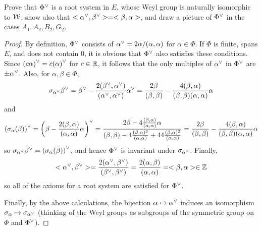 \begin{ex}\label{9.2}
  Prove that ${\Phi}^{\vee}$ is a root system in $E$, whose Weyl group is naturally isomorphic to ${\cal W}$; show also that $< {\alpha}^{\vee}, {\beta}^{\vee}>=<\beta,\alpha>$, and draw a picture of ${\Phi}^{\vee}$ in the cases $A_1,A_2,B_2,G_2$.
\end{ex}
\begin{proof}
  By definition, ${\Phi}^{\vee}$ consists of ${\alpha}^{\vee} = 2\alpha/(\alpha,\alpha)$ for $\alpha\in\Phi$. If $\Phi$ is finite, spans $E$, and does not contain $0$, it is obvious that ${\Phi}^{\vee}$ also satisfies these conditions. Since ${(c\alpha)}^{\vee}=c{(\alpha)}^{\vee}$ for $c\in {\mathbb R}$, it follows that the only multiples of ${\alpha}^{\vee}$ in ${\Phi}^{\vee}$ are $\pm{\alpha}^{\vee}$. Also, for $\alpha,\beta\in\Phi$,
  \begin{equation*}
    \sigma_{{\alpha}^{\vee}}{\beta}^{\vee} = {\beta}^{\vee} - \frac{2({\beta}^{\vee},{\alpha}^{\vee})}{({\alpha}^{\vee},{\alpha}^{\vee})}{\alpha}^{\vee} = \frac{2\beta}{(\beta,\beta)} - \frac{4(\beta,\alpha)}{(\beta,\beta)(\alpha,\alpha)}\alpha
  \end{equation*}
  and
  \begin{equation*}
    {(\sigma_{\alpha}(\beta))}^{\vee} = {\left(\beta-\frac{2(\beta,\alpha)}{(\alpha,\alpha)}\alpha\right)}^{\vee} = \frac{2\beta-4\frac{(\beta,\alpha)}{(\alpha,\alpha)}\alpha}{(\beta,\beta)-4\frac{(\beta,\alpha)^2}{(\alpha,\alpha)}+44\frac{(\beta,\alpha)^2}{(\alpha,\alpha)}} = \frac{2\beta}{(\beta,\beta)} - \frac{4(\beta,\alpha)}{(\beta,\beta)(\alpha,\alpha)}\alpha
  \end{equation*}
  so $\sigma_{{\alpha}^{\vee}}{\beta}^{\vee} = {(\sigma_{\alpha}(\beta))}^{\vee}$, and hence ${\Phi}^{\vee}$ is invariant under $\sigma_{{\alpha}^{\vee}}$. Finally,
  \begin{equation*}
    <{\alpha}^{\vee},{\beta}^{\vee}> = \frac{2({\alpha}^{\vee},{\beta}^{\vee})}{({\beta}^{\vee},{\beta}^{\vee})} = \frac{2(\alpha,\beta)}{(\alpha,\alpha)} = <\beta,\alpha> \in{\mathbb Z}
  \end{equation*}
  so all of the axioms for a root system are satisfied for ${\Phi}^{\vee}$.

  Finally, by the above calculations, the bijection $\alpha\mapsto{\alpha}^{\vee}$ induces an isomorphism $\sigma_{\alpha}\mapsto\sigma_{{\alpha}^{\vee}}$ (thinking of the Weyl groups as subgroups of the symmetric group on $\Phi$ and ${\Phi}^{\vee}$).
\end{proof}

